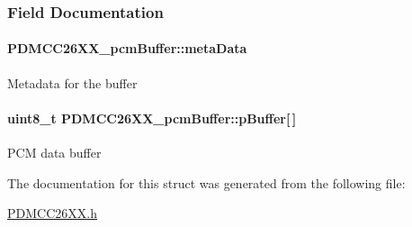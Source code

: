\subsubsection{Field Documentation}
\paragraph[{meta\+Data}]{ P\+D\+M\+C\+C26\+X\+X\+\_\+pcm\+Buffer\+::meta\+Data}\label{struct_p_d_m_c_c26_x_x__pcm_buffer_ac652edcb2ef46127630cc5c765bccee0}
Metadata for the buffer 
\paragraph[{p\+Buffer}]{\setlength{\rightskip}{0pt plus 5cm}uint8\+\_\+t P\+D\+M\+C\+C26\+X\+X\+\_\+pcm\+Buffer\+::p\+Buffer\mbox{[}$\,$\mbox{]}}\label{struct_p_d_m_c_c26_x_x__pcm_buffer_abdff62b23b9567ca243328c5350b0ea9}
P\+C\+M data buffer 

The documentation for this struct was generated from the following file\+:\begin{DoxyCompactItemize}
\item 
\hyperlink{_p_d_m_c_c26_x_x_8h}{P\+D\+M\+C\+C26\+X\+X.\+h}\end{DoxyCompactItemize}

